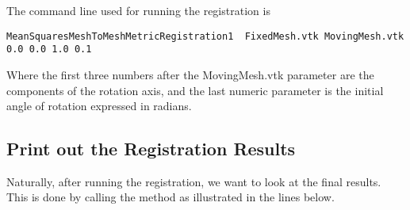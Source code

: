 \documentclass{InsightArticle}
\begin{document}
The command line used for running the registration is

\begin{verbatim} 
MeanSquaresMeshToMeshMetricRegistration1  FixedMesh.vtk MovingMesh.vtk 0.0 0.0 1.0 0.1
\end{verbatim} 

Where the first three numbers after the MovingMesh.vtk parameter are the
components of the rotation axis, and the last numeric parameter is the initial
angle of rotation expressed in radians.


\subsection{Print out the Registration Results}

Naturally, after running the registration, we want to look at the final
results. This is done by calling the  method
as illustrated in the lines below.

\begin{center}

\end{center}


%
%



\end{document}
